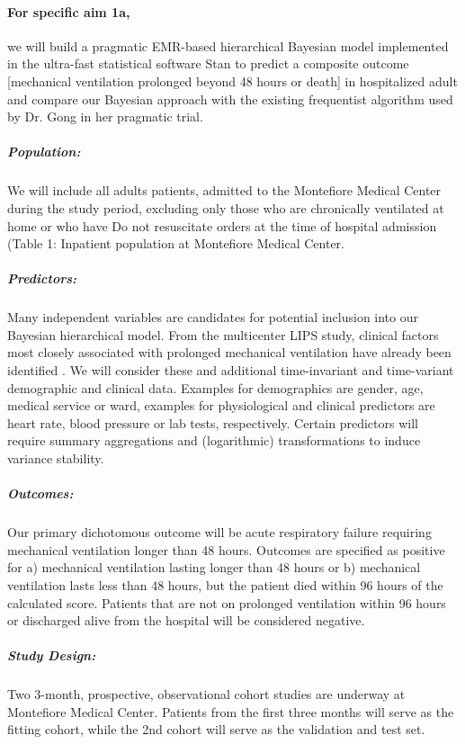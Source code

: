 \documentclass[11pt,notitlepage]{article}
\begin{document}
\paragraph*{For specific aim 1a,} we will build a pragmatic EMR-based hierarchical Bayesian model implemented in the ultra-fast statistical software Stan to predict a composite outcome [mechanical ventilation prolonged beyond 48 hours or death] in hospitalized adult and compare our Bayesian approach with the existing frequentist algorithm used by Dr. Gong in her pragmatic trial.

\subparagraph*{Population:}
We will include all adults patients, admitted to the Montefiore Medical Center during the study period, excluding only those who are chronically ventilated at home or who have Do not resuscitate orders at the time of hospital admission (Table 1: Inpatient population at Montefiore Medical Center. 

\subparagraph*{Predictors:}
Many independent variables are candidates for potential inclusion into our Bayesian hierarchical model. From the multicenter LIPS study, clinical factors most closely associated with prolonged mechanical ventilation have already been identified \cite{Herridge_12594312}. We will consider these and additional time-invariant and time-variant demographic and clinical data. Examples for demographics are gender, age, medical service or ward, examples for physiological and clinical predictors are heart rate, blood pressure or lab tests, respectively. Certain predictors will require summary aggregations and (logarithmic) transformations to induce variance stability.

\subparagraph*{Outcomes:}
Our primary dichotomous outcome will be acute respiratory failure requiring mechanical ventilation longer than 48 hours. Outcomes are specified as positive for a) mechanical ventilation lasting longer than 48 hours or b) mechanical ventilation lasts less than 48 hours, but the patient died within 96 hours of the calculated score. Patients that are not on prolonged ventilation within 96 hours or discharged alive from the hospital will be considered negative.

\subparagraph*{Study Design:}
Two 3-month, prospective, observational cohort studies are underway at Montefiore Medical Center. Patients from the first three months will serve as the fitting cohort, while the 2nd cohort will serve as the validation and test set.
\end{document}
